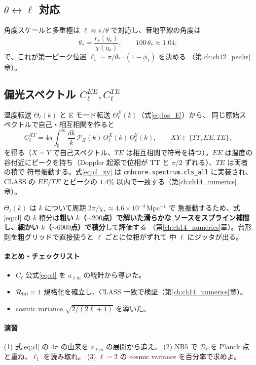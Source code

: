 \subsection{$\theta\leftrightarrow\ell$ 対応}
角度スケールと多重極は $\ell\approx\pi/\theta$ で対応し、音地平線の角度は
\begin{equation}
  \theta_*=\frac{r_s(\eta_*)}{\chi(\eta_*)},\qquad 100\,\theta_*\approx1.04,
\end{equation}
で、これが第一ピーク位置 $\ell_1\sim\pi/\theta_*\cdot(1-\phi_1)$ を決める
（第\ref{ch:ch12_peaks}章）。

\subsection{偏光スペクトル $C_\ell^{EE},C_\ell^{TE}$}
温度転送 $\Theta_\ell(k)$ と E モード転送 $\Theta^E_\ell(k)$（式\eqref{eq:los_E}）から、
同じ原始スペクトルで自己・相互相関を作ると
\begin{equation}
  C_\ell^{XY}=4\pi\int_0^\infty\frac{dk}{k}\,\mathcal P_\mathcal R(k)\,
  \Theta^X_\ell(k)\,\Theta^Y_\ell(k),\qquad XY\in\{TT,EE,TE\},
  \label{eq:cl_xy}
\end{equation}
を得る（$X=Y$ で自己スペクトル、$TE$ は相互相関で符号を持つ）。$EE$ は温度の
谷付近にピークを持ち（Doppler 起源で位相が TT と $\pi/2$ ずれる）、$TE$ は両者の積で
符号振動する。式\eqref{eq:cl_xy} は \texttt{cmbcore.spectrum.cls\_all} に実装され、CLASS の
$EE/TE$ とピークの $1.4\%$ 以内で一致する（第\ref{ch:ch14_numerics}章）。

\begin{numreality}
$\Theta_\ell(k)$ は $k$ について周期 $2\pi/\chi_*\approx4.6\times10^{-4}\,\mathrm{Mpc^{-1}}$ で
急振動するため、式\eqref{eq:cl} の $k$ 積分は\textbf{粗い $k$（$\sim200$点）で解いた滑らかな
ソースをスプライン補間し、細かい $k$（$\sim6000$点）で積分}して評価する
（第\ref{ch:ch14_numerics}章）。台形則を粗グリッドで直接使うと $\ell$ ごとに位相がずれて
中 $\ell$ にジッタが出る。
\end{numreality}

\paragraph{まとめ・チェックリスト}
\begin{itemize}
  \item $C_\ell$ 公式\eqref{eq:cl} を $a_{\ell m}$ の統計から導いた。
  \item $\mathcal R_{\rm ini}=1$ 規格化を確立し、CLASS 一致で検証（第\ref{ch:ch14_numerics}章）。
  \item cosmic variance $\sqrt{2/(2\ell+1)}$ を導いた。
\end{itemize}

\paragraph{演習}
(1) 式\eqref{eq:cl} の $4\pi$ の由来を $a_{\ell m}$ の展開から追え。
(2) NB5 で $\mathcal D_\ell$ を Planck 点と重ね、$\ell_1$ を読み取れ。
(3) $\ell=2$ の cosmic variance を百分率で求めよ。
